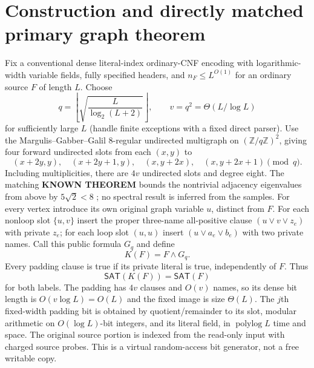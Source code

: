 \documentclass[11pt]{article}
\newcommand{\SAT}{\mathsf{SAT}}
\begin{document}
\section*{Construction and directly matched primary graph theorem}
Fix a conventional dense literal-index ordinary-CNF encoding with logarithmic-width variable fields, fully specified headers, and $n_F\le L^{O(1)}$ for an ordinary source $F$ of length $L$. Choose
\[
q=\left\lfloor\sqrt{\frac{L}{\log_2(L+2)}}\right\rfloor,\qquad v=q^2=\Theta(L/\log L)
\]
for sufficiently large $L$ (handle finite exceptions with a fixed direct parser). Use the Margulis--Gabber--Galil 8-regular undirected multigraph on $(\mathbb Z/q\mathbb Z)^2$, giving four forward undirected slots from each $(x,y)$ to
\[
(x+2y,y),\quad (x+2y+1,y),\quad
(x,y+2x),\quad(x,y+2x+1)\pmod q.
\]
Including multiplicities, there are $4v$ undirected slots and degree eight. The matching \textbf{KNOWN THEOREM} bounds the nontrivial adjacency eigenvalues from above by $5\sqrt2<8$ \cite{gabber,afp}; no spectral result is inferred from the samples. For every vertex introduce its own original graph variable $u$, distinct from $F$. For each nonloop slot $\{u,v\}$ insert the proper three-name all-positive clause $(u\vee v\vee z_e)$ with private $z_e$; for each loop slot $(u,u)$ insert $(u\vee a_e\vee b_e)$ with two private names. Call this public formula $G_q$ and define
\[
K(F)=F\wedge G_q.
\]
Every padding clause is true if its private literal is true, independently of $F$. Thus
\[
\SAT(K(F))=\SAT(F)
\]
for both labels. The padding has $4v$ clauses and $O(v)$ names, so its dense bit length is $O(v\log L)=O(L)$ and the fixed image is size $\Theta(L)$. The $j$th fixed-width padding bit is obtained by quotient/remainder to its slot, modular arithmetic on $O(\log L)$-bit integers, and its literal field, in $\operatorname{polylog}L$ time and space. The original source portion is indexed from the read-only input with charged source probes. This is a virtual random-access bit generator, not a free writable copy.
\end{document}
